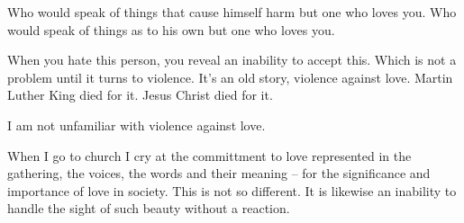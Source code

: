 

Who would speak of things that cause himself harm but one who loves
you.  Who would speak of things as to his own but one who loves you.

When you hate this person, you reveal an inability to accept this.
Which is not a problem until it turns to violence.  It's an old story,
violence against love.  Martin Luther King died for it.  Jesus Christ
died for it.  

I am not unfamiliar with violence against love.  

When I go to church I cry at the committment to love represented in
the gathering, the voices, the words and their meaning -- for the
significance and importance of love in society.  This is not so
different.  It is likewise an inability to handle the sight of such
beauty without a reaction.

\bye
